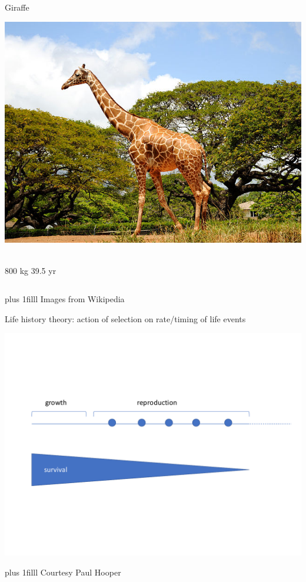 \documentclass{beamer}
\newcommand{\btVFill}{\vskip0pt plus 1filll}
\begin{document}
\begin{frame}
\begin{columns}[c]
     \begin{block}{Giraffe}
      \begin{center}
        \includegraphics[height=.25\textheight]{640px-Giraffe!_(4565230826).jpg}\
      \end{center}
      800 kg \hfill 39.5 yr
    \end{block}
  \end{columns}

  \btVFill
  \small Images from Wikipedia \normalsize
\end{frame}

\begin{frame}{Life history theory: action of selection on rate/timing of life events}
  \begin{center}
    \includegraphics[page=1,width=.8\textwidth]{hooper_slides_condensed.pdf}
  \end{center}
  \btVFill
  \small Courtesy Paul Hooper\normalsize
\end{frame}
\end{document}
